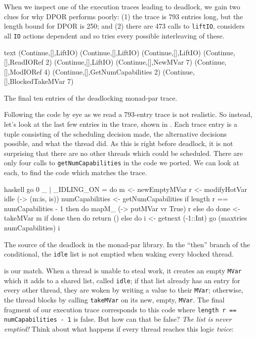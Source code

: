 When we inspect one of the execution traces leading to deadlock, we
gain two clues for why DPOR performs poorly: (1) the trace is 793
entries long, but the length bound for DPOR is 250; and (2) there are
473 calls to \verb|liftIO|, \dejafu{} considers all \verb|IO| actions
dependent and so tries every possible interleaving of these.

\begin{listing}
\centering
\begin{cminted}{text}
(Continue,[],LiftIO)
(Continue,[],LiftIO)
(Continue,[],LiftIO)
(Continue,[],ReadIORef 2)
(Continue,[],LiftIO)
(Continue,[],NewMVar 7)
(Continue,[],ModIORef 4)
(Continue,[],GetNumCapabilities 2)
(Continue,[],BlockedTakeMVar 7)
\end{cminted}
\caption{The final ten entries of the deadlocking monad-par trace.}\label{lst:parmonad_example3}
\end{listing}

Following the code by eye as we read a 793-entry trace is not
realistic.  So instead, let's look at the last few entries in the
trace, shown in .  Each trace entry is a
tuple consisting of the scheduling decision made, the alternative
decisions possible, and what the thread did.  As this is right before
deadlock, it is not surprising that there are no other threads which
could be scheduled.  There are only four calls to
\verb|getNumCapabilities| in the code we ported.  We can look at each,
to find the code which matches the trace.

\begin{listing}
\centering
\begin{cminted}{haskell}
go 0 _ | _IDLING_ON =
  do m <- newEmptyMVar
     r <- modifyHotVar idle (\is -> (m:is, is))
     numCapabilities <- getNumCapabilities
     if length r == numCapabilities - 1
       then do
         mapM_ (\vr -> putMVar vr True) r
       else do
         done <- takeMVar m
         if done
           then do
             return ()
           else do
             i <- getnext (-1::Int)
             go (maxtries numCapabilities) i
\end{cminted}
\caption[The source of the deadlock in the monad-par library.]{The source of the deadlock in the monad-par library.  In the ``then'' branch of the conditional, the \texttt{idle} list is not emptied when waking every blocked thread.}\label{lst:parmonad_example4}
\end{listing}

 is our match.  When a thread is unable to
steal work, it creates an empty \verb|MVar| which it adds to a shared
list, called \verb|idle|; if that list already has an entry for every
other thread, they are woken by writing a value to their \verb|MVar|;
otherwise, the thread blocks by calling \verb|takeMVar| on its new,
empty, \verb|MVar|.  The final fragment of our execution trace
corresponds to this code where \verb|length r == numCapabilities - 1|
is false.  But how can that be false?  \emph{The list is never
  emptied!}  Think about what happens if every thread reaches this
logic \emph{twice}:

